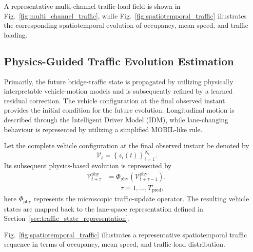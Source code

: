\documentclass[journal]{IEEEtran}
\begin{document}
A representative multi-channel traffic-load field is shown in Fig.~\ref{fig:multi_channel_traffic}, while Fig.~\ref{fig:spatiotemporal_traffic} illustrates the corresponding spatiotemporal evolution of occupancy, mean speed, and traffic loading.

\subsection{Physics-Guided Traffic Evolution Estimation}
\label{sec:physics_guided_evolution}

Primarily, the future bridge-traffic state is propagated by utilizing physically interpretable vehicle-motion models and is subsequently refined by a learned residual correction. The vehicle configuration at the final observed instant provides the initial condition for the future evolution. Longitudinal motion is described through the Intelligent Driver Model (IDM), while lane-changing behaviour is represented by utilizing a simplified MOBIL-like rule.

Let the complete vehicle configuration at the final observed instant be denoted by
\begin{equation}
\mathcal{V}_{t}=\left\{z_i(t)\right\}_{i=1}^{N_t}.
\end{equation}
Its subsequent physics-based evolution is represented by
\begin{equation}
\begin{aligned}
\mathcal{V}_{t+\tau}^{\mathrm{phy}}&=\Phi_{\mathrm{phy}}\left(\mathcal{V}_{t+\tau-1}^{\mathrm{phy}}\right),\\
&\qquad\tau=1,\ldots,T_{\mathrm{pred}},
\end{aligned}
\end{equation}
here $\Phi_{\mathrm{phy}}$ represents the microscopic traffic-update operator. The resulting vehicle states are mapped back to the lane-space representation defined in Section~\ref{sec:traffic_state_representation}.

Fig.~\ref{fig:spatiotemporal_traffic} illustrates a representative spatiotemporal traffic sequence in terms of occupancy, mean speed, and traffic-load distribution.
\end{document}
